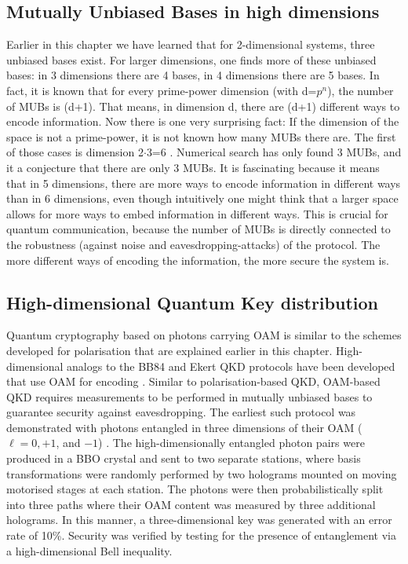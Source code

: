 \documentclass{article}
\begin{document}
\subsection{Mutually Unbiased Bases in high dimensions}
Earlier in this chapter we have learned that for 2-dimensional systems, three unbiased bases exist. For larger dimensions, one finds more of these unbiased bases: in 3 dimensions there are 4 bases, in 4 dimensions there are 5 bases. In fact, it is known that for every prime-power dimension (with d=$p^n$), the number of MUBs is (d+1). That means, in dimension d, there are (d+1) different ways to encode information. Now there is one very surprising fact: If the dimension of the space is not a prime-power, it is not known how many MUBs there are. The first of those cases is dimension 2$\cdot$3=6 \cite{bengtsson2006three,wiesniak2011entanglement}. Numerical search has only found 3 MUBs, and it a conjecture that there are only 3 MUBs. It is fascinating because it means that in 5 dimensions, there are more ways to encode information in different ways than in 6 dimensions, even though intuitively one might think that a larger space allows for more ways to embed information in different ways. This is crucial for quantum communication, because the number of MUBs is directly connected to the robustness (against noise and eavesdropping-attacks) of the protocol. The more different ways of encoding the information, the more secure the system is.


\subsection{High-dimensional Quantum Key distribution}

Quantum cryptography based on photons carrying OAM is similar to the schemes developed for polarisation that are explained earlier in this chapter. High-dimensional analogs to the BB84 and Ekert QKD protocols have been developed that use OAM for encoding \cite{Malik:2014ht}. Similar to polarisation-based QKD, OAM-based QKD requires measurements to be performed in mutually unbiased bases to guarantee security against eavesdropping. The earliest such protocol was demonstrated with photons entangled in three dimensions of their OAM ($\ell=0,+1$, and $-1$) \cite{Groeblacher:2005ec}. The high-dimensionally entangled photon pairs were produced in a BBO crystal and sent to two separate stations, where basis transformations were randomly performed by two holograms mounted on moving motorised stages at each station. The photons were then probabilistically split into three paths where their OAM content was measured by three additional holograms. In this manner, a three-dimensional key was generated with an error rate of 10\%. Security was verified by testing for the presence of entanglement via a high-dimensional Bell inequality.
\end{document}
